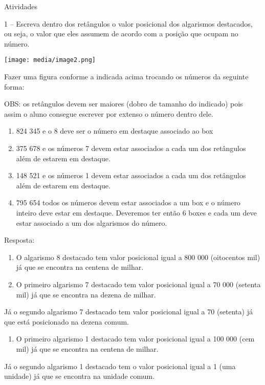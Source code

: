 Atividades

1 -- Escreva dentro dos retângulos o valor posicional dos algarismos
destacados, ou seja, o valor que eles assumem de acordo com a posição
que ocupam no número.

\texttt{[image: media/image2.png]}

Fazer uma figura conforme a indicada acima trocando os números da
seguinte forma:

OBS: os retângulos devem ser maiores (dobro de tamanho do indicado) pois
assim o aluno consegue escrever por extenso o número dentro dele.

\begin{enumerate}
\def\labelenumi{\alph{enumi})}
\item
  824 345 e o 8 deve ser o número em destaque associado ao box
\item
  375 678 e os números 7 devem estar associados a cada um dos retângulos
  além de estarem em destaque.
\item
  148 521 e os números 1 devem estar associados a cada um dos retângulos
  além de estarem em destaque.
\item
  795 654 todos os números devem estar associados a um box e o número
  inteiro deve estar em destaque. Deveremos ter então 6 boxes e cada um
  deve estar associado a um dos algarismos do número.
\end{enumerate}

Resposta:

\begin{enumerate}
\def\labelenumi{\alph{enumi})}
\item
  O algarismo 8 destacado tem valor posicional igual a 800 000
  (oitocentos mil) já que se encontra na centena de milhar.
\item
  O primeiro algarismo 7 destacado tem valor posicional igual a 70 000
  (setenta mil) já que se encontra na dezena de milhar.
\end{enumerate}

Já o segundo algarismo 7 destacado tem valor posicional igual a 70
(setenta) já que está posicionado na dezena comum.

\begin{enumerate}
\def\labelenumi{\alph{enumi})}
\item
  O primeiro algarismo 1 destacado tem valor posicional igual a 100 000
  (cem mil) já que se encontra na centena de milhar.
\end{enumerate}

Já o segundo algarismo 1 destacado tem o valor posicional igual a 1 (uma
unidade) já que se encontra na unidade comum.

